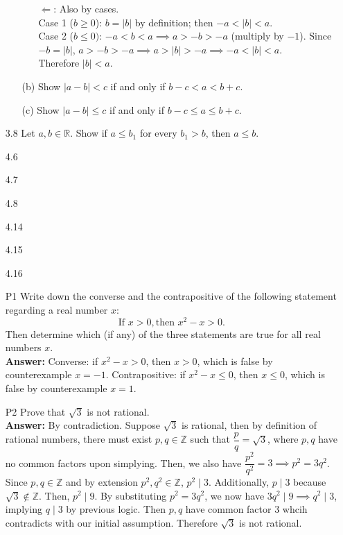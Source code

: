 \documentclass{article}
\begin{document}
\begin{itemize}
\begin{itemize}
\begin{itemize}
                              \item [$\Leftarrow$:] Also by cases. \\Case 1 ($b\geq 0$): $b=|b|$ by definition; then $-a<|b|<a$. \\Case 2 ($b\leq 0)$: $-a<b<a\implies a>-b>-a$ (multiply by $-1$). Since $-b=|b|$, $a>-b>-a\implies a>|b|>-a\implies -a<|b|<a$. \\Therefore $|b|<a$.
                        \end{itemize}
                  \item [(b)] Show $|a-b|<c$ if and only if $b-c<a<b+c$.
                  \item [(c)] Show $|a-b|\leq c$ if and only if $b-c\leq a\leq b+c$.
            \end{itemize}
      \item [3.8] Let $a,b\in\mathbb{R}$. Show if $a\leq b_1$ for every $b_1>b$, then $a\leq b$.
      \item [4.6]
      \item [4.7]
      \item [4.8]
      \item [4.14]
      \item [4.15]
      \item [4.16]
      \item [P1] Write down the converse and the contrapositive of the following statement regarding a real number $x$: \[\text{If } x>0, \text{then } x^2-x>0.\] Then determine which (if any) of the three statements are true for all real numbers $x$.\\
            \textbf{Answer: } Converse: if $x^2-x>0$, then $x>0$, which is false by counterexample $x=-1$. Contrapositive: if $x^2-x\leq0$, then $x\leq0$, which is false by counterexample $x=1$.
      \item [P2] Prove that $\sqrt{3}$ is not rational.\\
            \textbf{Answer: } By contradiction. Suppose $\sqrt{3}$ is rational, then by definition of rational numbers, there must exist $p,q\in\mathbb{Z}$ such that $\dfrac{p}{q}=\sqrt{3}$, where $p,q$ have no common factors upon simplying. Then, we also have $\dfrac{p^2}{q^2}=3\implies p^2=3q^2$. Since $p,q\in\mathbb{Z}$ and by extension $p^2,q^2\in\mathbb{Z}$, $p^2\mid 3$. Additionally, $p\mid 3$ because $\sqrt{3}\notin\mathbb{Z}$. Then, $p^2\mid 9$. By substituting $p^2=3q^2$, we now have $3q^2\mid 9\implies q^2\mid 3$, implying $q\mid 3$ by previous logic. Then $p,q$ have common factor $3$ whcih contradicts with our initial assumption. Therefore $\sqrt{3}$ is not rational.
\end{itemize}
\end{document}
